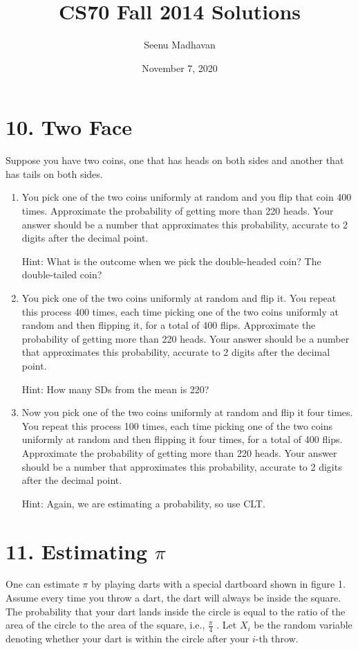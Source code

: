 \documentclass[11pt]{article}
\title{CS70 Fall 2014 Solutions}
\author{Seenu Madhavan}
\date{November 7, 2020}
\newenvironment{qparts}{\begin{enumerate}[{(}a{)}]}{\end{enumerate}}
\begin{document}
\maketitle



\section*{10. Two Face}
Suppose you have two coins, one that has heads on both sides and another that has tails on both sides.
\begin{qparts}
\item
You pick one of the two coins uniformly at random and you flip that coin 400 times. Approximate the
probability of getting more than 220 heads. Your answer should be a number that approximates this
probability, accurate to 2 digits after the decimal point.

\color{blue}
Hint: What is the outcome when we pick the double-headed coin? The double-tailed coin?

\color{black}
\item
You pick one of the two coins uniformly at random and flip it. You repeat this process 400 times, each
time picking one of the two coins uniformly at random and then flipping it, for a total of 400 flips.
Approximate the probability of getting more than 220 heads. Your answer should be a number that
approximates this probability, accurate to 2 digits after the decimal point.

\color{blue}
Hint: How many SDs from the mean is 220?

\color{black}
\item
Now you pick one of the two coins uniformly at random and flip it four times. You repeat this process
100 times, each time picking one of the two coins uniformly at random and then flipping it four times,
for a total of 400 flips. Approximate the probability of getting more than 220 heads. Your answer
should be a number that approximates this probability, accurate to 2 digits after the decimal point.

\color{blue}
Hint: Again, we are estimating a probability, so use CLT.

\color{black}

\end{qparts}









\section*{11. Estimating $\pi$}
One can estimate $\pi$ by playing darts with a special dartboard shown in figure 1. Assume every time you
throw a dart, the dart will always be inside the square. The probability that your dart lands inside the circle
is equal to the ratio of the area of the circle to the area of the square, i.e., $\frac{\pi}{4}$
. Let $X_i$ be the random variable
denoting whether your dart is within the circle after your $i$-th throw.
\end{document}
